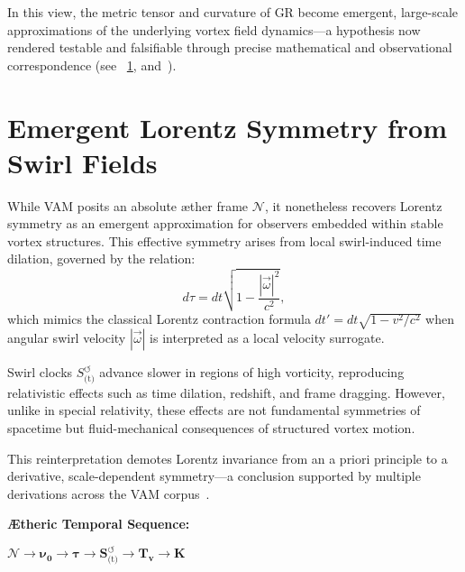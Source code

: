 In this view, the metric tensor and curvature of GR become emergent, large-scale approximations of the underlying vortex field dynamics—a hypothesis now rendered testable and falsifiable through precise mathematical and observational correspondence (see ~\ref{sec:lorentz_recovery}, and~\cite{VAM-8, VAM-3}).

\section{Emergent Lorentz Symmetry from Swirl Fields}
\label{sec:lorentz_recovery}

While VAM posits an absolute æther frame \(\boldsymbol{\mathcal{N}}\), it nonetheless recovers Lorentz symmetry as an emergent approximation for observers embedded within stable vortex structures. This effective symmetry arises from local swirl-induced time dilation, governed by the relation:
\begin{equation}
    d\tau = dt \sqrt{1 - \frac{|\vec{\omega}|^2}{c^2}},
\end{equation}
which mimics the classical Lorentz contraction formula \(dt' = dt \sqrt{1 - v^2/c^2}\) when angular swirl velocity \(|\vec{\omega}|\) is interpreted as a local velocity surrogate.

Swirl clocks \(S^{\circlearrowleft}_\text{(t)}\) advance slower in regions of high vorticity, reproducing relativistic effects such as time dilation, redshift, and frame dragging. However, unlike in special relativity, these effects are not fundamental symmetries of spacetime but fluid-mechanical consequences of structured vortex motion.

This reinterpretation demotes Lorentz invariance from an a priori principle to a derivative, scale-dependent symmetry—a conclusion supported by multiple derivations across the VAM corpus~\cite{VAM-1, VAM-2, VAM-15}.

\vspace{0.8em}

\noindent\textbf{Ætheric Temporal Sequence:}
\begin{center}
\(\boldsymbol{\mathcal{N}} \to \boldsymbol{\nu_0} \to \boldsymbol{\tau} \to \boldsymbol{S}^{\boldsymbol{\circlearrowleft}}_\text{(t)} \to \boldsymbol{T_v} \to \mathbb{\boldsymbol{K}}\)
\end{center}